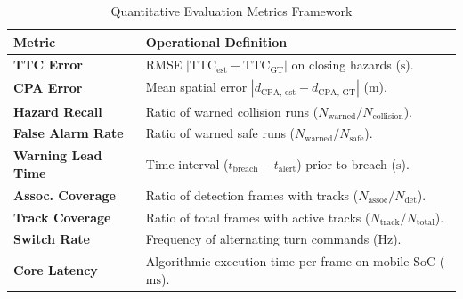 \begin{table}[t]
\caption{Quantitative Evaluation Metrics Framework}
\label{tab:metrics}
\centering
\footnotesize
\setlength{\tabcolsep}{4pt}
\begin{tabularx}{\columnwidth}{p{2.4cm}X}
\toprule
\textbf{Metric} & \textbf{Operational Definition} \\
\midrule
\textbf{TTC Error} & RMSE $|\text{TTC}_{\text{est}} - \text{TTC}_{\text{GT}}|$ on closing hazards ($\text{s}$). \\
\addlinespace[2pt]
\textbf{CPA Error} & Mean spatial error $|d_{\text{CPA, est}} - d_{\text{CPA, GT}}|$ ($\text{m}$). \\
\addlinespace[2pt]
\textbf{Hazard Recall} & Ratio of warned collision runs ($N_{\text{warned}} / N_{\text{collision}}$). \\
\addlinespace[2pt]
\textbf{False Alarm Rate} & Ratio of warned safe runs ($N_{\text{warned}} / N_{\text{safe}}$). \\
\addlinespace[2pt]
\textbf{Warning Lead Time} & Time interval ($t_{\text{breach}} - t_{\text{alert}}$) prior to breach ($\text{s}$). \\
\addlinespace[2pt]
\textbf{Assoc. Coverage} & Ratio of detection frames with tracks ($N_{\text{assoc}} / N_{\text{det}}$). \\
\addlinespace[2pt]
\textbf{Track Coverage} & Ratio of total frames with active tracks ($N_{\text{track}} / N_{\text{total}}$). \\
\addlinespace[2pt]
\textbf{Switch Rate} & Frequency of alternating turn commands ($\text{Hz}$). \\
\addlinespace[2pt]
\textbf{Core Latency} & Algorithmic execution time per frame on mobile SoC ($\text{ms}$). \\
\bottomrule
\end{tabularx}
\end{table}
